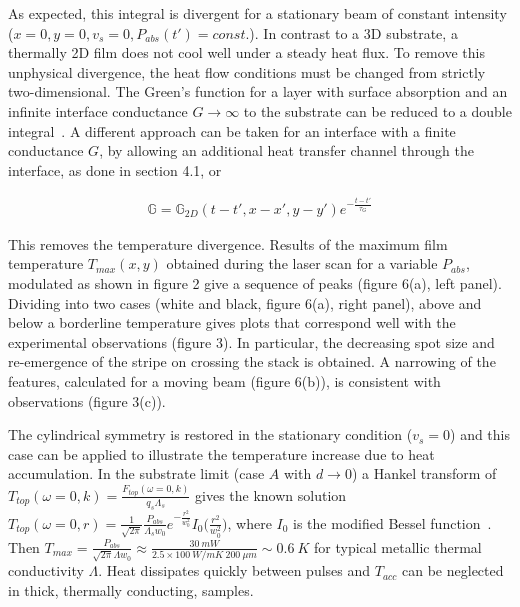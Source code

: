 \documentclass[5p]{elsarticle}
\begin{document}
As expected, this integral is divergent for a stationary beam of constant intensity ($x=0,y=0,v_{s}=0, P_{abs}(t')=const.$). In contrast to a 3D substrate, a thermally 2D film does not cool well under a steady heat flux. To remove this unphysical divergence, the heat flow conditions must be changed from strictly two-dimensional. The Green's function for a layer with surface absorption and an infinite interface conductance $G\rightarrow \infty$ to the substrate can be reduced to a double integral~\cite{1982Burgener}. A different approach can be taken for an interface with a finite conductance $G$, by allowing an additional heat transfer channel through the interface, as done in section 4.1, or

\begin{eqnarray}
\mathbb{G}=\mathbb{G}_{2D}(t-t',x-x',y-y') e^{-\frac{t-t'}{\tau_{G}}}
\end{eqnarray}

This removes the temperature divergence. Results of the maximum film temperature $T_{max}(x,y)$ obtained during the laser scan for a variable $P_{abs}$, modulated as shown in figure 2 give a sequence of peaks (figure 6(a), left panel). Dividing into two  cases (white and black, figure 6(a), right panel), above and below a borderline temperature gives plots that correspond well with the experimental observations (figure 3). In particular, the decreasing spot size and re-emergence of the stripe on crossing the stack is obtained. A narrowing of the features, calculated for a moving beam (figure 6(b)), is consistent with observations (figure 3(c)).

The cylindrical symmetry is restored in the stationary condition ($v_{s}=0$) and this case can be applied to illustrate the temperature increase due to heat accumulation. In the substrate limit (case $A$ with $d\rightarrow 0$) a Hankel transform of $T_{top}(\omega=0,k)=\frac{F_{top}(\omega=0,k)}{q_{s}\Lambda_{s}}$ gives the known solution $T_{top}(\omega=0,r)=\frac{1}{\sqrt{2 \pi}}\frac{P_{abs}}{\Lambda_{s} w_{0}} e^{-\frac{r^{2}}{w_{0}^{2}}}I_{0}\Big(\frac{r^{2}}{w_{0}^{2}}\Big)$, where $I_{0}$ is the modified Bessel function~\cite{2011Bauerle}. Then $T_{max}=\frac{P_{abs}}{\sqrt{2 \pi}\Lambda w_{0}} \approx \frac{30~mW}{2.5\times 100~W/mK ~200~\mu m}\sim 0.6~K $ for typical metallic thermal conductivity $\Lambda$. Heat dissipates quickly between pulses and $T_{acc}$ can be neglected in thick, thermally conducting, samples.
\end{document}
